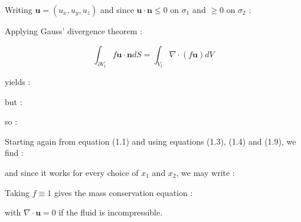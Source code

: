 \documentclass[a4paper]{article}
\begin{document}
\noindent Writing $\mathbf u=(u_x,u_y,u_z)$ and since $\mathbf u\cdot\mathbf n\leq0$ on $\sigma_1$ and $\geq0$ on $\sigma_2$ :


\noindent Applying Gauss' divergence theorem :

$$\int_{\partial V_t}f\mathbf u\cdot\mathbf ndS=\int_{V_t}\nabla\cdot(f\mathbf u)dV$$

\noindent yields :


\noindent but :


\noindent so :


\noindent Starting again from equation (1.1) and using equations (1.3), (1.4) and (1.9), we find :


\noindent and since it works for every choice of $x_1$ and $x_2$, we may write :


\noindent Taking $f\equiv1$ gives the mass conservation equation :


\noindent with $\nabla\cdot\mathbf u=0$ if the fluid is incompressible.
\end{document}
